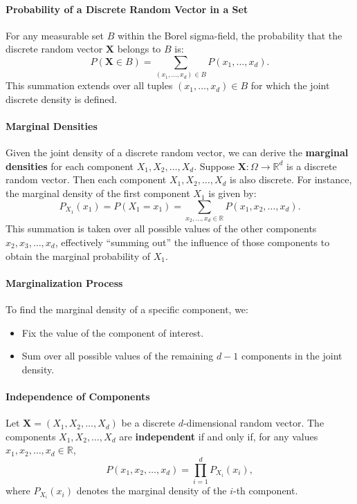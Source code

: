 \paragraph{Probability of a Discrete Random Vector in a Set}
For any measurable set \( B \) within the Borel sigma-field, the probability that the discrete random vector \( \mathbf{X} \) belongs to \( B \) is:
\[
P(\mathbf{X} \in B) = \sum_{(x_1, \dots, x_d) \in B} P(x_1, \dots, x_d).
\]
This summation extends over all tuples \( (x_1, \dots, x_d) \in B \) for which the joint discrete density is defined.

\paragraph{Marginal Densities}
Given the joint density of a discrete random vector, we can derive the \textbf{marginal densities} for each component \( X_1, X_2, \dots, X_d \). \newline
Suppose \( \mathbf{X}: \Omega \to \mathbb{R}^d \) is a discrete random vector. Then each component \( X_1, X_2, \dots, X_d \) is also discrete. \newline
For instance, the marginal density of the first component \( X_1 \) is given by:
\[
P_{X_1}(x_1) = P(X_1 = x_1) = \sum_{x_2, \dots, x_d \in \mathbb{R}} P(x_1, x_2, \dots, x_d).
\]
This summation is taken over all possible values of the other components \( x_2, x_3, \dots, x_d \), effectively “summing out” the influence of those components to obtain the marginal probability of \( X_1 \).

\paragraph{Marginalization Process}
To find the marginal density of a specific component, we:
\begin{itemize}
    \item Fix the value of the component of interest.
    \item Sum over all possible values of the remaining \( d-1 \) components in the joint density.
\end{itemize}

\paragraph{Independence of Components}
Let \( \mathbf{X} = (X_1, X_2, \dots, X_d) \) be a discrete \( d \)-dimensional random vector. The components \( X_1, X_2, \dots, X_d \) are \textbf{independent} if and only if, for any values \( x_1, x_2, \dots, x_d \in \mathbb{R} \),
\[
P(x_1, x_2, \dots, x_d) = \prod_{i=1}^d P_{X_i}(x_i),
\]
where \( P_{X_i}(x_i) \) denotes the marginal density of the \( i \)-th component.

